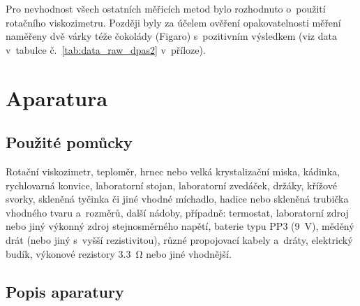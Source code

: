 \documentclass[12pt]{article}
\begin{document}
Pro nevhodnost všech ostatních měřicích metod bylo rozhodnuto o~použití rotačního viskozimetru. Později byly za účelem ověření opakovatelnosti měření naměřeny dvě várky téže čokolády (Figaro) s~pozitivním výsledkem (viz data v~tabulce č.~\ref{tab:data_raw_dpas2} v~příloze).

\newpage%
\section{Aparatura}%

\subsection{Použité pomůcky}%

Rotační viskozimetr, teploměr, hrnec nebo velká krystalizační miska, kádinka, rychlovarná konvice, laboratorní stojan, laboratorní zvedáček, držáky, křížové svorky, skleněná tyčinka či jiné vhodné míchadlo, hadice nebo skleněná trubička vhodného tvaru a~rozměrů, další nádoby, případně: termostat, laboratorní zdroj nebo jiný výkonný zdroj stejnosměrného napětí, baterie typu PP3 (\SI{9}{\volt}), měděný drát (nebo jiný s~vyšší rezistivitou), různé propojovací kabely a~dráty, elektrický budík, výkonové rezistory \SI{3,3}{\ohm} nebo jiné vhodnější.

\subsection{Popis aparatury}%
\end{document}
